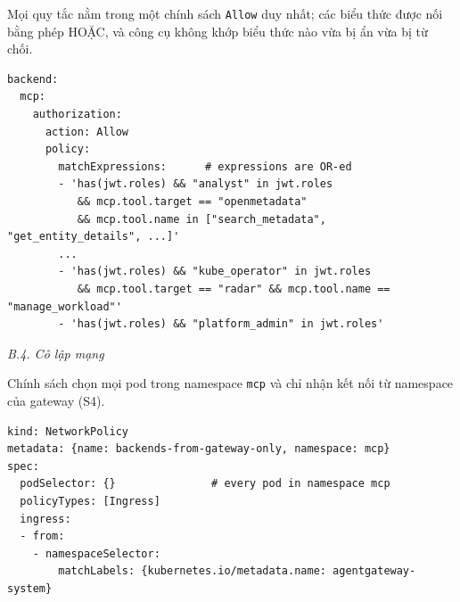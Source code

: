 \documentclass[a4paper]{article}
\begin{document}
Mọi quy tắc nằm trong một chính sách \texttt{Allow} duy nhất; các biểu thức được nối bằng phép HOẶC, và công cụ không khớp biểu thức nào vừa bị ẩn vừa bị từ chối.
\par\noindent\begin{minipage}{\linewidth}
\begin{lstlisting}
backend:
  mcp:
    authorization:
      action: Allow
      policy:
        matchExpressions:      # expressions are OR-ed
        - 'has(jwt.roles) && "analyst" in jwt.roles
           && mcp.tool.target == "openmetadata"
           && mcp.tool.name in ["search_metadata", "get_entity_details", ...]'
        ...
        - 'has(jwt.roles) && "kube_operator" in jwt.roles
           && mcp.tool.target == "radar" && mcp.tool.name == "manage_workload"'
        - 'has(jwt.roles) && "platform_admin" in jwt.roles'
\end{lstlisting}
\end{minipage}\par
{}\textit{B.4. Cô lập mạng}

Chính sách chọn mọi pod trong namespace \texttt{mcp} và chỉ nhận kết nối từ namespace của gateway (S4).
\par\noindent\begin{minipage}{\linewidth}
\begin{lstlisting}
kind: NetworkPolicy
metadata: {name: backends-from-gateway-only, namespace: mcp}
spec:
  podSelector: {}               # every pod in namespace mcp
  policyTypes: [Ingress]
  ingress:
  - from:
    - namespaceSelector:
        matchLabels: {kubernetes.io/metadata.name: agentgateway-system}
\end{lstlisting}
\end{minipage}\par
\end{document}
